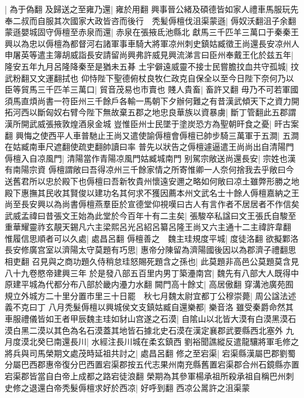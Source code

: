 |{
	為于偽翻}
及歸送之至雍乃還|{
	雍於用翻}
興事晉公緒及碩德皆如家人禮車馬服玩先奉二叔而自服其次國家大政皆咨而後行　秃髪傉檀伐沮渠蒙遜|{
	傉奴沃翻沮子余翻}
蒙遜嬰城固守傉檀至赤泉而還|{
	赤泉在張掖氐池縣北}
獻馬三千匹羊三萬口于秦秦王興以為忠以傉檀為都督河右諸軍事車騎大將軍凉州刺史鎮姑臧徵王尚還長安凉州人申屠英等遣主簿胡威詣長安請留尚興弗許威見興流涕言曰臣州奉戴王化於兹五年|{
	隆安五年九月呂隆降秦至是猶未五朞}
土宇僻遠威靈不接士民嘗膽抆血共守孤城|{
	抆武粉翻又文運翻拭也}
仰恃陛下聖德俯杖良牧仁政克自保全以至今日陛下奈何乃以臣等貿馬三千匹羊三萬口|{
	貿音茂易也市賣也}
賤人貴畜|{
	畜許又翻}
毋乃不可若軍國須馬直煩尚書一符臣州三千餘戶各輸一馬朝下夕辦何難之有昔漢武傾天下之資力開拓河西以斷匈奴右臂今陛下無故棄五郡之地忠良華族以資暴虜|{
	斷丁管翻此五郡謂漢所開武威張掖敦煌酒泉金城}
豈惟臣州士民墜于塗炭恐方為聖朝旰食之憂|{
	旰古案翻}
興悔之使西平人車普馳止王尚又遣使諭傉檀會傉檀已帥步騎三萬軍于五澗|{
	五澗在姑臧南車尺遮翻使疏吏翻帥讀曰率}
普先以狀告之傉檀遽逼遣王尚尚出自清陽門傉檀入自凉風門|{
	清陽當作青陽凉風門姑臧城南門}
别駕宗敞送尚還長安|{
	宗姓也漢有南陽宗資}
傉檀謂敞曰吾得凉州三千餘家情之所寄惟卿一人奈何捨我去乎敞曰今送舊君所以忠於殿下也傉檀曰吾新牧貴州懷遠安邇之略如何敞曰凉土雖弊形勝之地殿下惠撫其民收其賢俊以建功名其何求不獲因薦本州文武名士十餘人傉檀嘉納之王尚至長安興以為尚書傉檀燕羣臣於宣德堂仰視嘆曰古人有言作者不居居者不作信矣武威孟禕曰昔張文王始為此堂於今百年十有二主矣|{
	張駿卒私諡曰文王張氏自駿至重華耀靈祚玄靚天錫凡六主梁熙呂光呂紹呂纂呂隆王尚又六主通十二主禕許韋翻}
惟履信思順者可以久處|{
	處昌呂翻}
傉檀善之　魏主珪規度平城|{
	度徒洛翻}
欲擬鄴洛長安修廣宫室以濟陽太守莫題有巧思|{
	惠帝分陳留為濟陽國後因以為郡濟子禮翻思相吏翻}
召見與之商功題久侍稍怠珪怒賜死題含之孫也|{
	此莫題非高邑公莫題莫含見八十九卷愍帝建興三年}
於是發八部五百里内男丁築灅南宫|{
	魏先有八部大人既得中原建平城為代都分布八部於畿内灅力水翻}
闕門高十餘丈|{
	高居傲翻}
穿溝池廣苑囿規立外城方二十里分置市里三十日罷　秋七月魏太尉宜都丁公穆崇薨|{
	周公諡法述義不克曰丁}
八月秃髮傉檀以興城侯文支鎮姑臧自還樂都|{
	樂音洛}
雖受秦爵命然其車服禮儀皆如王者甲辰魏主珪如豺山宫遂之石漠|{
	自隂山以北皆大漠有白漠黑漠石漠白黑二漠以其色為名石漠蓋其地皆石據北史石漠在漢定襄郡武要縣西北塞外}
九月度漠北癸巳南還長川|{
	水經注長川城在柔玄鎮西}
劉裕聞譙縱反遣龍驤將軍毛修之將兵與司馬榮期文處茂時延祖共討之|{
	處昌呂翻}
修之至宕渠|{
	宕渠縣漢屬巴郡劉蜀分屬巴西郡惠帝復分巴西置宕渠郡按五代志果州南充縣舊置宕渠郡合州石鏡縣亦置宕渠郡皆當自白帝上成都之路宕徒浪翻}
榮期為其參軍楊承祖所殺承祖自稱巴州刺史修之退還白帝秃髮傉檀求好於西凉|{
	好呼到翻}
西凉公暠許之沮渠蒙

